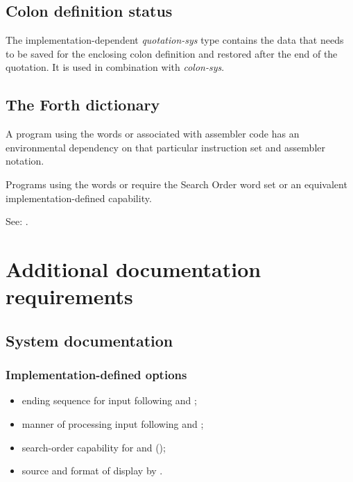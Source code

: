 \subsection{Colon definition status}
\label{tools:quotation-sys}

The implementation-dependent \emph{quotation-sys} type
contains the data that needs to be saved for the enclosing
colon definition and restored after the end of the quotation.
It is used in combination with \emph{colon-sys}.

\subsection{The Forth dictionary} %
\label{tools:dict}

A program using the words  or  associated
with assembler code has an environmental dependency on that
particular instruction set and assembler notation.

Programs using the words  or  require
the Search Order word set or an equivalent implementation-defined
capability.

See: .

\section{Additional documentation requirements} %

\subsection{System documentation} %

\subsubsection{Implementation-defined options} %
\label{tools:impopt}

\begin{itemize}
\item ending sequence for input following
	 and
	;
\item manner of processing input following
	 and
	;
\item search-order capability for
	 and
	();
\item source and format of display by .
\end{itemize}

